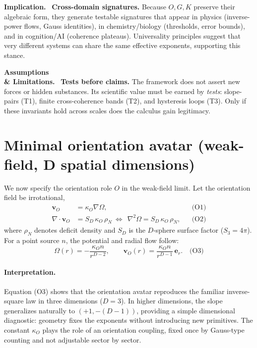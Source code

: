 \documentclass[12pt,a4paper,oneside]{scrreprt}
\def\({}%
\def\){}%
\newenvironment{implication}{\par\vspace{0.5em}\noindent\textbf{Implication.}\ }{\par\vspace{0.5em}}
\newenvironment{limitation}{\par\vspace{0.5em}\noindent\textbf{Assumptions \\ \& Limitations.}\ }{\par\vspace{0.5em}}
\begin{document}
\begin{implication}
\textbf{Cross-domain signatures.} 
Because $O,G,K$ preserve their algebraic form, they generate testable 
signatures that appear in physics (inverse-power flows, Gauss identities), 
in chemistry/biology (thresholds, error bounds), and in cognition/AI 
(coherence plateaus). 
Universality principles \citep{Wilson1971RG} suggest that very different 
systems can share the same effective exponents, supporting this stance.
\end{implication}

\begin{limitation}
\textbf{Tests before claims.} 
The framework does not assert new forces or hidden substances. 
Its scientific value must be earned by \emph{tests}:  
slope-pairs (T1), finite cross-coherence bands (T2), and hysteresis loops (T3). 
Only if these invariants hold across scales does the calculus gain legitimacy.
\end{limitation}

\section{Minimal orientation avatar (weak-field, \(D\) spatial dimensions)}\label{sec:ur-orientation}

We now specify the orientation role $O$ in the weak-field limit. 
Let the orientation field be irrotational,
\begin{align}
\mathbf v_O &= \kappa_O \nabla \Omega, && \text{(O1)}\\
\nabla \!\cdot \mathbf v_O &= S_D \, \kappa_O \, \rho_N 
\ \Longleftrightarrow\ \ \nabla^2 \Omega = S_D \, \kappa_O \, \rho_N, && \text{(O2)}
\end{align}
where $\rho_N$ denotes deficit density and $S_D$ is the $D$-sphere surface factor 
($S_3 = 4\pi$). 
For a point source $n$, the potential and radial flow follow:
\begin{equation}
\Omega(r) = -\frac{\kappa_O n}{r^{D-2}}, 
\qquad 
\mathbf v_O(r) = \frac{\kappa_O n}{r^{D-1}} \, \mathbf e_r. 
\quad \text{(O3)}
\end{equation}

\paragraph{Interpretation.} 
Equation (O3) shows that the orientation avatar reproduces the familiar 
inverse-square law in three dimensions ($D=3$). 
In higher dimensions, the slope generalizes naturally to $(+1, -(D{-}1))$, 
providing a simple dimensional diagnostic: geometry fixes the exponents without 
introducing new primitives. 
The constant $\kappa_O$ plays the role of an orientation coupling, fixed once 
by Gauss-type counting and not adjustable sector by sector.
\end{document}
